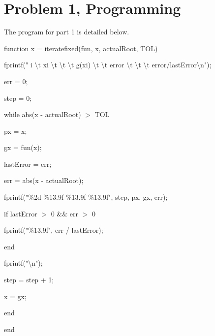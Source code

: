 \documentclass{article}
\begin{document}
\section*{Problem 1, Programming}
\begin{lstProgramming}
The program for part 1 is detailed below.
\vspace{1mm}

function x = iteratefixed(fun, x, actualRoot, TOL)

\hspace{5mm}fprintf(" i \backslash t \hspace{1mm} xi \hspace{1mm} \backslash t \hspace{1mm} \backslash t\hspace{1mm}  \backslash t \hspace{1mm}  g(xi) \hspace{1mm}  \backslash t \hspace{1mm} \backslash t \hspace{1mm} error \hspace{1mm}  \backslash t \hspace{1mm} \backslash  t \hspace{1mm}\backslash t \hspace{1mm}  error/lastError\backslash n");
    
\hspace{5mm}err = 0;
    
\hspace{5mm}step = 0;

\hspace{5mm}while abs(x - actualRoot) $>$ TOL
    
\hspace{10mm}px = x;
        
\hspace{10mm}gx = fun(x);
        
\hspace{10mm}lastError = err;
        
\hspace{10mm}err = abs(x - actualRoot);
        
\hspace{10mm}fprintf("\%2d \%13.9f \%13.9f \%13.9f", step, px, gx, err);

\hspace{10mm}if lastError $>$ 0 $\&$$\&$ err $>$ 0
        
\hspace{15mm}fprintf("\%13.9f", err / lastError);
            
\hspace{10mm}end

\hspace{15mm}fprintf("\backslash n");
        
\hspace{10mm}step = step + 1;
        
\hspace{10mm}x = gx;
        
\hspace{5mm}end

end
\pagebreak
\end{lstProgramming}
\end{document}

